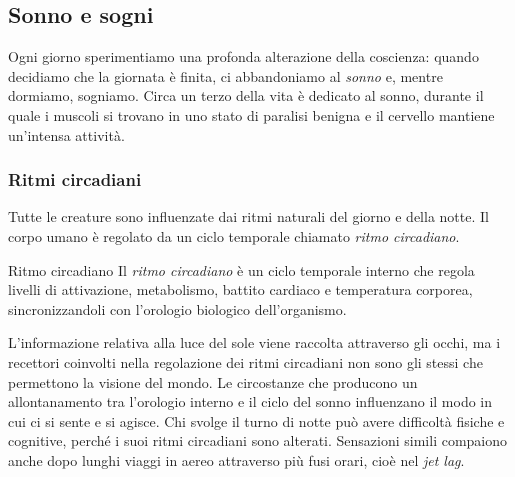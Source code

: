 \documentclass[a4paper]{article}
\begin{document}
\subsection{Sonno e sogni}
Ogni giorno sperimentiamo una profonda alterazione della coscienza: quando decidiamo che la giornata è finita, ci abbandoniamo al \emph{sonno} e, mentre dormiamo, sogniamo.
Circa un terzo della vita è dedicato al sonno, durante il quale i muscoli si trovano in uno stato di paralisi benigna e il cervello mantiene un'intensa attività.
\subsubsection{Ritmi circadiani}
Tutte le creature sono influenzate dai ritmi naturali del giorno e della notte. Il corpo umano è regolato da un ciclo temporale chiamato \emph{ritmo circadiano}.
\begin{snippetdefinition}{Ritmo circadiano}
    Il \emph{ritmo circadiano} è un ciclo temporale interno che regola livelli di attivazione, metabolismo, battito cardiaco e temperatura corporea, sincronizzandoli con l'orologio biologico dell'organismo.
\end{snippetdefinition}
L'informazione relativa alla luce del sole viene raccolta attraverso gli occhi, ma i recettori coinvolti nella regolazione dei ritmi circadiani non sono gli stessi che permettono la visione del mondo.
Le circostanze che producono un allontanamento tra l'orologio interno e il ciclo del sonno influenzano il modo in cui ci si sente e si agisce. Chi svolge il turno di notte può avere difficoltà fisiche e cognitive, perché i suoi ritmi circadiani sono alterati. Sensazioni simili compaiono anche dopo lunghi viaggi in aereo attraverso più fusi orari, cioè nel \emph{jet lag}.
\end{document}
